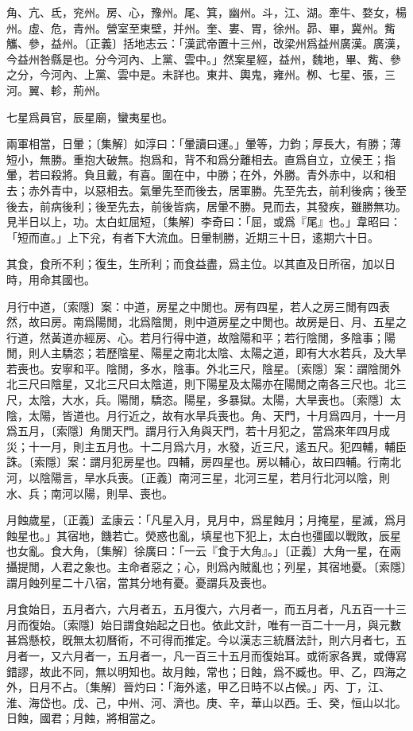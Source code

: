 角、亢、氐，兖州。房、心，豫州。尾、箕，幽州。斗，江、湖。牽牛、婺女，楊州。虛、危，青州。營室至東壁，并州。奎、婁、胃，徐州。昴、畢，冀州。觜觿、參，益州。〔正義〕括地志云：「漢武帝置十三州，改梁州爲益州廣漢。廣漢，今益州咎縣是也。分今河內、上黨、雲中。」然案星經，益州，魏地，畢、觜、參之分，今河內、上黨、雲中是。未詳也。東井、輿鬼，雍州。栁、七星、張，三河。翼、軫，荊州。

七星爲員官，辰星廟，蠻夷星也。

兩軍相當，日暈；〔集解〕如淳曰：「暈讀曰運。」暈等，力鈞；厚長大，有勝；薄短小，無勝。重抱大破無。抱爲和，背不和爲分離相去。直爲自立，立侯王；指暈，若曰殺將。負且戴，有喜。圍在中，中勝；在外，外勝。青外赤中，以和相去；赤外青中，以惡相去。氣暈先至而後去，居軍勝。先至先去，前利後病；後至後去，前病後利；後至先去，前後皆病，居暈不勝。見而去，其發疾，雖勝無功。見半日以上，功。太白虹屈短，〔集解〕李奇曰：「屈，或爲『尾』也。」韋昭曰：「短而直。」上下兊，有者下大流血。日暈制勝，近期三十日，逺期六十日。

其食，食所不利；復生，生所利；而食益盡，爲主位。以其直及日所宿，加以日時，用命其國也。

月行中道，〔索隱〕案：中道，房星之中閒也。房有四星，若人之房三閒有四表然，故曰房。南爲陽閒，北爲陰閒，則中道房星之中閒也。故房是日、月、五星之行道，然黃道亦經房、心。若月行得中道，故陰陽和平；若行陰閒，多陰事；陽閒，則人主驕恣；若歷陰星、陽星之南北太陰、太陽之道，即有大水若兵，及大旱若喪也。安寧和平。陰閒，多水，陰事。外北三尺，陰星。〔索隱〕案：謂陰閒外北三尺曰陰星，又北三尺曰太陰道，則下陽星及太陽亦在陽閒之南各三尺也。北三尺，太陰，大水，兵。陽閒，驕恣。陽星，多暴獄。太陽，大旱喪也。〔索隱〕太陰，太陽，皆道也。月行近之，故有水旱兵喪也。角、天門，十月爲四月，十一月爲五月，〔索隱〕角閒天門。謂月行入角與天門，若十月犯之，當爲來年四月成災；十一月，則主五月也。十二月爲六月，水發，近三尺，逺五尺。犯四輔，輔臣誅。〔索隱〕案：謂月犯房星也。四輔，房四星也。房以輔心，故曰四輔。行南北河，以陰陽言，旱水兵喪。〔正義〕南河三星，北河三星，若月行北河以陰，則水、兵；南河以陽，則旱、喪也。

月蝕歲星，〔正義〕孟康云：「凡星入月，見月中，爲星蝕月；月掩星，星滅，爲月蝕星也。」其宿地，饑若亡。熒惑也亂，填星也下犯上，太白也彊國以戰敗，辰星也女亂。食大角，〔集解〕徐廣曰：「一云『食于大角』。」〔正義〕大角一星，在兩攝提閒，人君之象也。主命者惡之；心，則爲內賊亂也；列星，其宿地憂。〔索隱〕謂月蝕列星二十八宿，當其分地有憂。憂謂兵及喪也。

月食始日，五月者六，六月者五，五月復六，六月者一，而五月者，凡五百一十三月而復始。〔索隱〕始日謂食始起之日也。依此文計，唯有一百二十一月，與元數甚爲懸校，旣無太初曆術，不可得而推定。今以漢志三統曆法計，則六月者七，五月者一，又六月者一，五月者一，凡一百三十五月而復始耳。或術家各異，或傳寫錯謬，故此不同，無以明知也。故月蝕，常也；日蝕，爲不臧也。甲、乙，四海之外，日月不占。〔集解〕晉灼曰：「海外逺，甲乙日時不以占候。」丙、丁，江、淮、海岱也。戊、己，中州、河、濟也。庚、辛，華山以西。壬、癸，恒山以北。日蝕，國君；月蝕，將相當之。

